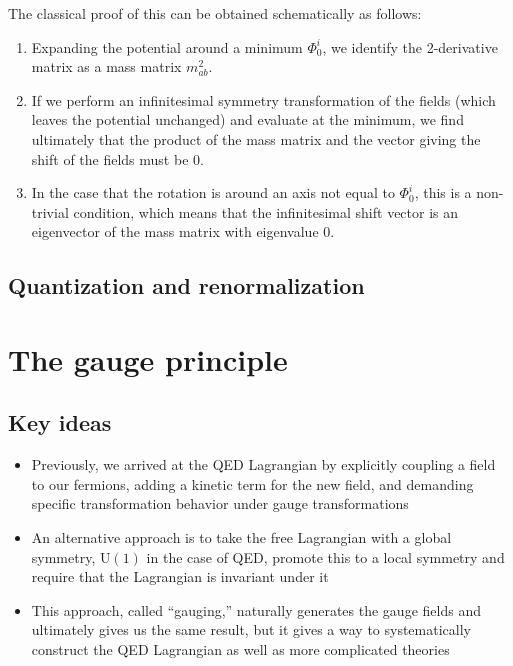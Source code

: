 \documentclass[12pt]{memoir}
\begin{document}
The classical proof of this can be obtained schematically as follows:
\begin{enumerate}
  \item Expanding the potential around a minimum $\Phi_0^i$, we identify the 2-derivative matrix as a mass matrix $m^2_{ab}$.
  \item If we perform an infinitesimal symmetry transformation of the fields
    (which leaves the potential unchanged)
    and evaluate at the minimum,
    we find ultimately that the product of the mass matrix and the vector giving the shift of the fields must be 0.
  \item In the case that the rotation is around an axis not equal to $\Phi_0^i$, this is a non-trivial condition,
    which means that the infinitesimal shift vector is an eigenvector of the mass matrix with eigenvalue 0.
\end{enumerate}



\section{Quantization and renormalization}

\chapter{The gauge principle}

\section{Key ideas}

\begin{itemize}
  \item Previously, we arrived at the QED Lagrangian by explicitly coupling a field to our fermions,
    adding a kinetic term for the new field,
    and demanding specific transformation behavior under gauge transformations
  \item An alternative approach is to take the free Lagrangian with a global symmetry,
    $\text{U}(1)$ in the case of QED,
    promote this to a local symmetry and require that the Lagrangian is invariant under it
  \item This approach, called ``gauging,'' naturally generates the gauge fields and ultimately gives us the same result,
    but it gives a way to systematically construct the QED Lagrangian as well as more complicated theories
\end{itemize}
\end{document}
